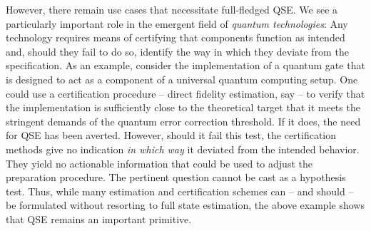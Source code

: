 However, there remain use cases that necessitate full-fledged QSE.
We see a particularly important role in the emergent field of \emph{quantum technologies}:
Any technology requires means of certifying that components function as intended and, should they fail to do so, identify the way in which they deviate from the specification.
As an example, consider the implementation of a quantum gate that is designed to act as a component of a universal quantum computing setup.
One could use a certification procedure -- direct fidelity estimation, say -- to verify that the implementation is sufficiently close to the theoretical target that it meets the stringent demands of the quantum error correction threshold.
If it does, the need for QSE has been averted.
However, should it fail this test, the certification methods give no indication \emph{in which way} it deviated from the intended behavior.
They yield no actionable information that could be used to adjust the preparation procedure.
The pertinent question  cannot be cast as a hypothesis test.
Thus, while many estimation and certification schemes can -- and should -- be formulated without resorting to full state estimation, the above example shows that QSE remains an important primitive.\\


